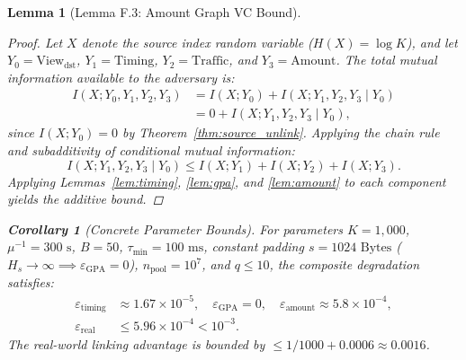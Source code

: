 \documentclass[journal,10pt,twocolumn]{IEEEtran}
\newtheorem{lemma}[theorem]{Lemma}
\newtheorem{corollary}[theorem]{Corollary}
\theoremstyle{definition}
\theoremstyle{remark}
\begin{document}
\begin{lemma}[Lemma F.3: Amount Graph VC Bound]
\begin{proof}
Let $X$ denote the source index random variable ($H(X) = \log K$), and let $Y_0 = \text{View}_{\text{dst}}$, $Y_1 = \text{Timing}$, $Y_2 = \text{Traffic}$, and $Y_3 = \text{Amount}$. The total mutual information available to the adversary is:
\begin{align}
I(X; Y_0, Y_1, Y_2, Y_3) &= I(X; Y_0) + I(X; Y_1, Y_2, Y_3 \mid Y_0) \nonumber \\
&= 0 + I(X; Y_1, Y_2, Y_3 \mid Y_0),
\end{align}
since $I(X; Y_0) = 0$ by Theorem~\ref{thm:source_unlink}. Applying the chain rule and subadditivity of conditional mutual information:
\begin{equation}
I(X; Y_1, Y_2, Y_3 \mid Y_0) \le I(X; Y_1) + I(X; Y_2) + I(X; Y_3).
\end{equation}
Applying Lemmas~\ref{lem:timing}, \ref{lem:gpa}, and \ref{lem:amount} to each component yields the additive bound.
\end{proof}

\begin{corollary}[Concrete Parameter Bounds]
For parameters $K = 1,000$, $\mu^{-1} = 300\text{ s}$, $B = 50$, $\tau_{\min} = 100\text{ ms}$, constant padding $s = 1024\text{ Bytes}$ ($H_s \to \infty \implies \varepsilon_{\text{GPA}} = 0$), $n_{\text{pool}} = 10^7$, and $q \le 10$, the composite degradation satisfies:
\begin{align}
\varepsilon_{\text{timing}} &\approx 1.67 \times 10^{-5}, \quad \varepsilon_{\text{GPA}} = 0, \quad \varepsilon_{\text{amount}} \approx 5.8 \times 10^{-4}, \nonumber \\
\varepsilon_{\text{real}} &\le 5.96 \times 10^{-4} < 10^{-3}.
\end{align}
The real-world linking advantage is bounded by $\le 1/1000 + 0.0006 \approx 0.0016$.
\end{corollary}


\end{lemma}
\end{document}
